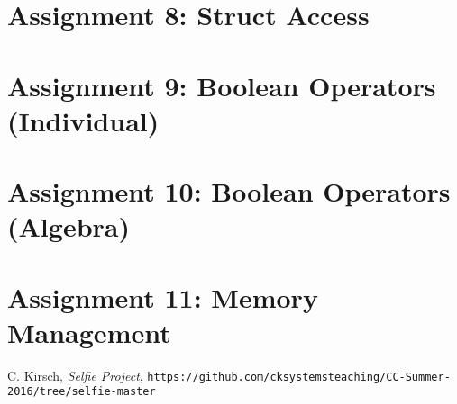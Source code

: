 \documentclass[a4paper,12pt]{article}
\begin{document}
\section{Assignment 8: Struct Access}

\section{Assignment 9: Boolean Operators (Individual)}

\section{Assignment 10: Boolean Operators (Algebra)}

\section{Assignment 11: Memory Management}

\begin{thebibliography}{99}

C. Kirsch, \textit{Selfie Project},
\texttt{https://github.com/cksystemsteaching/CC-Summer-2016/tree/selfie-master}

\end{thebibliography}
\end{document}
